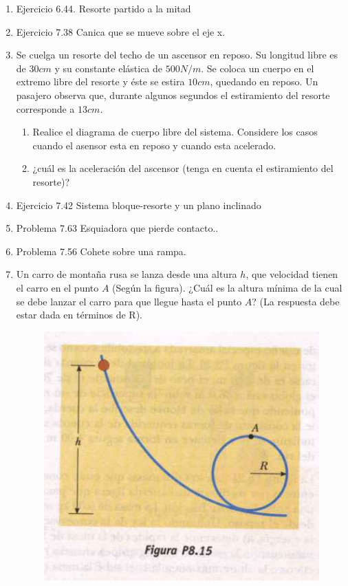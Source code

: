 \documentclass[letterpaper,10pt,onecolumn]{article}
\begin{document}
\begin{enumerate}

\item Ejercicio 6.44. Resorte partido a la mitad %
\item Ejercicio 7.38 Canica que se mueve sobre el eje x. %
\item Se cuelga un resorte del techo de un ascensor en reposo. Su longitud libre es de $30cm$ y su constante elástica de $500N/m$. Se coloca un cuerpo en el extremo libre del resorte y éste se estira $10cm$, quedando en reposo. Un pasajero observa que, durante algunos segundos el estiramiento del resorte corresponde a $13cm$. 
\begin{enumerate}
\item
Realice el diagrama de cuerpo libre del sistema. Considere los casos cuando el asensor esta en reposo  y cuando esta acelerado. 
 \item
¿cuál es la aceleración del ascensor (tenga en cuenta el estiramiento del resorte)?
\end{enumerate}
\item Ejercicio 7.42 Sistema bloque-resorte y un plano inclinado %
\item Problema 7.63 Esquiadora que pierde contacto.. %
\item Problema 7.56 Cohete sobre una rampa. %
\item Un carro de montaña rusa se lanza desde una altura $h$, que velocidad tienen el carro en el punto $A$ (Según la figura). ¿Cuál es la altura mínima de la cual se debe lanzar el carro para que llegue hasta el punto $A$? (La respuesta debe estar dada en términos de R). 
\begin{figure}[h]
\begin{center} 
\includegraphics[scale=1.5]{montanarusa.jpg} 
\end{center} 
\end{figure}
 \end{enumerate}
 
\end{document}
